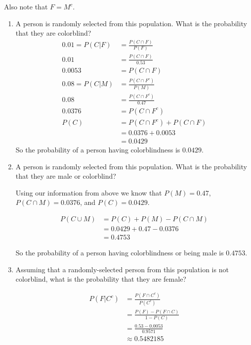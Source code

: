 \documentclass{article}
\begin{document}
\begin{enumerate}
        Also note that  $F=M^c$.
            \begin{enumerate}[label= (\alph*)] 
            \item A person is randomly selected from this population. What is the probability that they
            are colorblind?
            \begin{align*} 
                0.01=P(C|F)&=\frac{P(C\cap F)}{P(F)}\\
                0.01&=\frac{P(C\cap F)}{0.53}\\
                0.0053&=P(C\cap F)\\
                0.08=P(C|M)&=\frac{P(C\cap F^c)}{P(M)}\\
                0.08&=\frac{P(C\cap F^c)}{0.47}\\
                0.0376&=P(C\cap F^c)\\
                P(C)&=P(C\cap F^c)+P(C\cap F)\\
                &=0.0376+0.0053\\
                &=0.0429
            \end{align*}
            So the probability of a person having colorblindness is $0.0429$.

            \item  A person is randomly selected from this population. What is the probability that they
            are male or colorblind?

            Using our information from above we know that $P(M)=0.47$, $P(C\cap M)=0.0376$,
            and $P(C)=0.0429$.

            \begin{align*} 
                P(C\cup M)&=P(C)+P(M)-P(C\cap M)\\
                &=0.0429+0.47-0.0376\\
                &=0.4753
            \end{align*}

            So the probability of a person having colorblindness or being male
            is $0.4753$.

            \item Assuming that a randomly-selected person from this population is not colorblind,
            what is the probability that they are female?

            \begin{align*} 
                P(F|C^c)&=\frac{P(F\cap C^c)}{P(C^c)}\\
                &=\frac{P(F)-P(F\cap C)}{1-P(C)}\\
                &=\frac{0.53-0.0053}{0.9571}\\
                &\approx0.5482185
            \end{align*}


\end{enumerate}
\end{enumerate}
\end{document}
